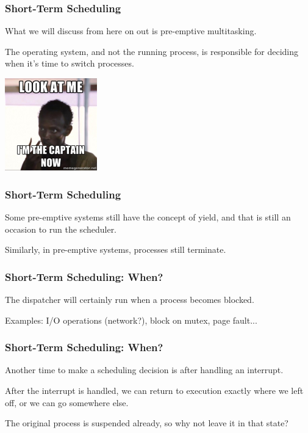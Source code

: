 \begin{frame}
\frametitle{Short-Term Scheduling}

What we will discuss from here on out is \alert{pre-emptive multitasking}.

The operating system, and not the running process, is responsible for deciding when it's time to switch processes. 

\begin{center}
	\includegraphics[width=0.3\textwidth]{images/captainnow.jpg}
\end{center}

\end{frame}

\begin{frame}
\frametitle{Short-Term Scheduling}

Some pre-emptive systems still have the concept of yield, and that is still an occasion to run the scheduler. 

Similarly, in pre-emptive systems, processes still terminate.


\end{frame}

\begin{frame}
\frametitle{Short-Term Scheduling: When?}

The dispatcher will certainly run when a process becomes blocked.

Examples: I/O operations (network?), block on mutex, page fault...


\end{frame}

\begin{frame}
\frametitle{Short-Term Scheduling: When?}

Another time to make a scheduling decision is after handling an interrupt.

After the interrupt is handled, we can return to execution exactly where we left off, or we can go somewhere else.

The original process is suspended already, so why not leave it in that state?

\end{frame}


